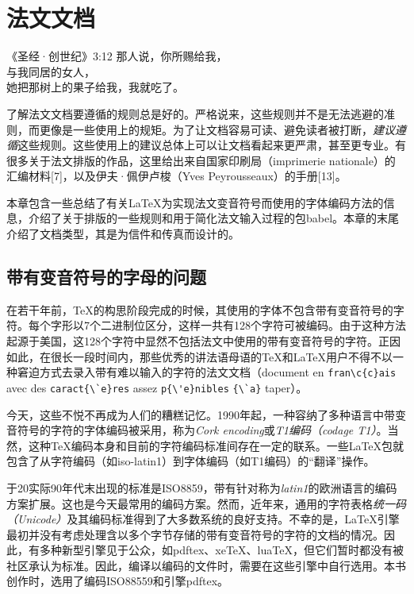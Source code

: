 \chapter{法文文档}

\begin{epigraphe}{《圣经·创世纪》3:12}
    那人说，你所赐给我，\\与我同居的女人，\\她把那树上的果子给我，我就吃了。
\end{epigraphe}

了解法文文档要遵循的规则总是好的。严格说来，这些规则并不是无法逃避的准则，而更像是一些使用上的规矩。为了让文档容易可读、避免读者被打断，\emph{建议遵循}这些规则。这些使用上的建议总体上可以让文档看起来更严肃，甚至更专业。有很多关于法文排版的作品，这里给出来自国家印刷局（imprimerie nationale）的汇编材料[7]，以及伊夫·佩伊卢梭（Yves Peyrousseaux）的手册[13]。

本章包含一些总结了有关\LaTeX 为实现法文变音符号而使用的字体编码方法的信息，介绍了关于排版的一些规则和用于简化法文输入过程的包\textsf{babel}。本章的末尾介绍了文档类型，其是为信件和传真而设计的。

\section{带有变音符号的字母的问题}

在若干年前，\TeX 的构思阶段完成的时候，其使用的字体不包含带有变音符号的字符。每个字形以7个二进制位区分，这样一共有128个字符可被编码。由于这种方法起源于美国，这128个字符中显然不包括法文中使用的带有变音符号的字符。正因如此，在很长一段时间内，那些优秀的讲法语母语的\TeX 和\LaTeX 用户不得不以一种窘迫方式去录入带有难以输入的字符的法文文档（document en \verb+fran\c{c}ais+ avec des \verb+caract{\`e}res+ assez \verb+p{\'e}nibles+ \verb+{\`a}+ taper）。

今天，这些不悦不再成为人们的糟糕记忆。1990年起，一种容纳了多种语言中带变音符号的字符的字体编码被采用，称为\emph{Cork encoding}或\emph{T1编码（codage T1）}。当然，这种\TeX 编码本身和目前的字符编码标准间存在一定的联系。一些\LaTeX 包就包含了从字符编码（如iso-latin1）到字体编码（如T1编码）的``翻译''操作。

\begin{exclamation}
    于20实际90年代末出现的标准是ISO8859，带有针对称为\emph{latin1}的欧洲语言的编码方案扩展。这也是今天最常用的编码方案。然而，近年来，通用的字符表格\emph{统一码（Unicode）}及其编码标准得到了大多数系统的良好支持。不幸的是，\LaTeX 引擎最初并没有考虑处理含以多个字节存储的带有变音符号的字符的文档的情况。因此，有多种新型引擎见于公众，如pdftex、xe\TeX 、lua\TeX ，但它们暂时都没有被社区承认为标准。因此，编译以编码的文件时，需要在这些引擎中自行选用。本书创作时，选用了编码ISO88559和引擎pdftex。
\end{exclamation}

